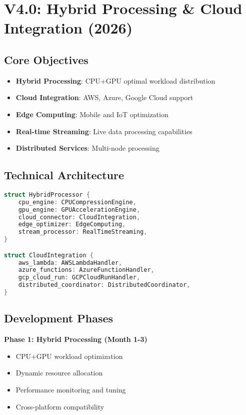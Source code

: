 \documentclass[12pt,a4paper]{article}
\begin{document}
\newpage

\section{V4.0: Hybrid Processing \& Cloud Integration (2026)}

\subsection{Core Objectives}
\begin{itemize}
    \item \textbf{Hybrid Processing}: CPU+GPU optimal workload distribution
    \item \textbf{Cloud Integration}: AWS, Azure, Google Cloud support
    \item \textbf{Edge Computing}: Mobile and IoT optimization
    \item \textbf{Real-time Streaming}: Live data processing capabilities
    \item \textbf{Distributed Services}: Multi-node processing
\end{itemize}

\subsection{Technical Architecture}
\begin{lstlisting}[language=C, caption=V4.0 Hybrid Architecture]
struct HybridProcessor {
    cpu_engine: CPUCompressionEngine,
    gpu_engine: GPUAccelerationEngine,
    cloud_connector: CloudIntegration,
    edge_optimizer: EdgeComputing,
    stream_processor: RealTimeStreaming,
}

struct CloudIntegration {
    aws_lambda: AWSLambdaHandler,
    azure_functions: AzureFunctionHandler,
    gcp_cloud_run: GCPCloudRunHandler,
    distributed_coordinator: DistributedCoordinator,
}
\end{lstlisting}

\subsection{Development Phases}
\textbf{Phase 1: Hybrid Processing (Month 1-3)}
\begin{itemize}
    \item CPU+GPU workload optimization
    \item Dynamic resource allocation
    \item Performance monitoring and tuning
    \item Cross-platform compatibility
\end{itemize}
\end{document}
